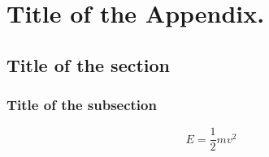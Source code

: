 \chapter{Title of the Appendix.\label{appendix02}}
\section{Title of the section}
\subsection{Title of the subsection}
\begin{equation}
	E=\frac{1}{2}mv^2
\end{equation}